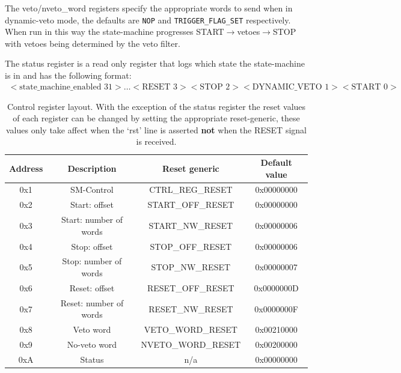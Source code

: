     The veto/nveto\_word registers specify the appropriate words to send when in dynamic-veto mode, the defaults are \texttt{NOP} and \texttt{TRIGGER\_FLAG\_SET} respectively. When run in this way the state-machine progresses START\(\rightarrow\)vetoes\(\rightarrow\)STOP with vetoes being determined by the veto filter.
      
    The status register is a read only register that logs which state the state-machine is in and has the following format:
    \begin{align} \label{fmt:status_reg}
        <\text{state\_machine\_enabled } 31>\ldots<\text{RESET } 3> <\text{STOP } 2> <\text{DYNAMIC\_VETO } 1> <\text{START } 0>
    \end{align}
	  
    \begin{table}
        \begin{center}
            \begin{tabular}{c|c | c |c}
                Address & Description             & Reset generic      & Default value  \\
                \hline                    
                0x1     & SM-Control              & CTRL\_REG\_RESET   & 0x00000000     \\ 
                0x2     & Start: offset           & START\_OFF\_RESET  & 0x00000000     \\  
                0x3     & Start: number of words  & START\_NW\_RESET   & 0x00000006     \\ 
                0x4     & Stop: offset            & STOP\_OFF\_RESET   & 0x00000006     \\ 
                0x5     & Stop: number of words   & STOP\_NW\_RESET    & 0x00000007     \\ 
                0x6     & Reset: offset           & RESET\_OFF\_RESET  & 0x0000000D     \\ 
                0x7     & Reset: number of words  & RESET\_NW\_RESET   & 0x0000000F     \\ 
                0x8     & Veto word               & VETO\_WORD\_RESET  & 0x00210000     \\ 
                0x9     & No-veto word            & NVETO\_WORD\_RESET & 0x00200000     \\ 
                0xA     & Status                  & n/a                & 0x00000000     \\ 
            \end{tabular}
        \end{center}
        \caption{Control register layout. With the exception of the status register the reset values of each register can be changed by setting the appropriate reset-generic, these values only take affect when the `rst' line is asserted \textbf{not} when the RESET signal is received.}
        \label{tab:ctrl_reg_default}
    \end{table}

